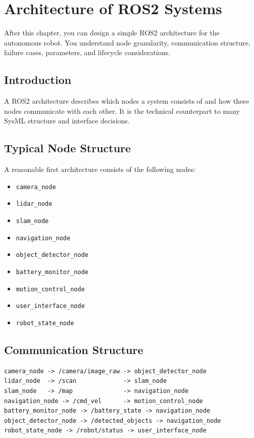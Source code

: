 \chapter{Architecture of ROS2 Systems}

\begin{lernziele}
After this chapter, you can design a simple ROS2 architecture for the autonomous robot. You understand node granularity, communication structure, failure cases, parameters, and lifecycle considerations.
\end{lernziele}

\section{Introduction}
A ROS2 architecture describes which nodes a system consists of and how these nodes communicate with each other. It is the technical counterpart to many SysML structure and interface decisions.

\section{Typical Node Structure}
A reasonable first architecture consists of the following nodes:

\begin{itemize}
    \item \texttt{camera\_node}
    \item \texttt{lidar\_node}
    \item \texttt{slam\_node}
    \item \texttt{navigation\_node}
    \item \texttt{object\_detector\_node}
    \item \texttt{battery\_monitor\_node}
    \item \texttt{motion\_control\_node}
    \item \texttt{user\_interface\_node}
    \item \texttt{robot\_state\_node}
\end{itemize}

\section{Communication Structure}
\begin{lstlisting}[style=plaintext]
camera_node -> /camera/image_raw -> object_detector_node
lidar_node  -> /scan             -> slam_node
slam_node   -> /map              -> navigation_node
navigation_node -> /cmd_vel      -> motion_control_node
battery_monitor_node -> /battery_state -> navigation_node
object_detector_node -> /detected_objects -> navigation_node
robot_state_node -> /robot/status -> user_interface_node
\end{lstlisting}

